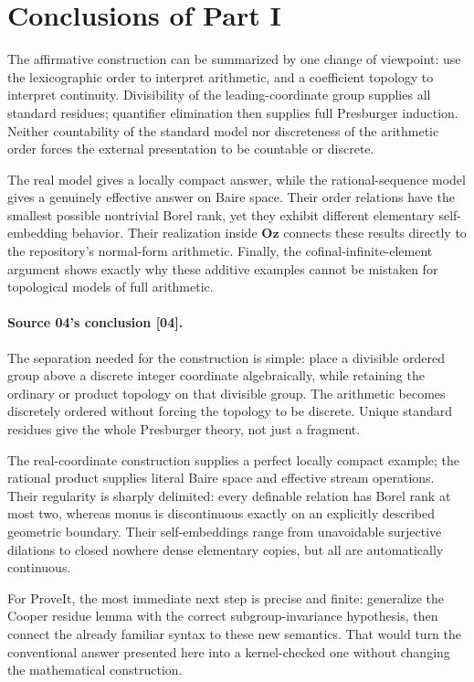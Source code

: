 \documentclass[11pt]{article}
\numberwithin{equation}{section}
\theoremstyle{definition}
\theoremstyle{remark}
\newcommand{\Oz}{\mathbf{Oz}}
\newcommand{\repo}{\textsf{ProveIt}}
\newcommand{\src}[1]{\textup{\textsf{\small[#1]}}}
\begin{document}
\section{Conclusions of Part I}\label{pma:pr:sec:conclusion}

The affirmative construction can be summarized by one change of viewpoint:
use the lexicographic order to interpret arithmetic, and a coefficient
topology to interpret continuity. Divisibility of the leading-coordinate
group supplies all standard residues; quantifier elimination then
supplies full Presburger induction. Neither countability of the standard
model nor discreteness of the arithmetic order forces the external
presentation to be countable or discrete.

The real model gives a locally compact answer, while the rational-sequence
model gives a genuinely effective answer on Baire space. Their order
relations have the smallest possible nontrivial Borel rank, yet they
exhibit different elementary self-embedding behavior. Their realization
inside $\Oz$ connects these results directly to the repository's
normal-form arithmetic. Finally, the cofinal-infinite-element argument
shows exactly why these additive examples cannot be mistaken for
topological models of full arithmetic.

\paragraph{Source 04's conclusion \src{04}.}

The separation needed for the construction is simple: place a divisible
ordered group above a discrete integer coordinate algebraically, while
retaining the ordinary or product topology on that divisible group.
The arithmetic becomes discretely ordered without forcing the topology
to be discrete. Unique standard residues give the whole Presburger theory,
not just a fragment.

The real-coordinate construction supplies a perfect locally compact
example; the rational product supplies literal Baire space and effective
stream operations. Their regularity is sharply delimited: every definable
relation has Borel rank at most two, whereas monus is discontinuous
exactly on an explicitly described geometric boundary. Their
self-embeddings range from unavoidable surjective dilations to closed
nowhere dense elementary copies, but all are automatically continuous.

For \repo, the most immediate next step is precise and finite: generalize
the Cooper residue lemma with the correct subgroup-invariance hypothesis,
then connect the already familiar syntax to these new semantics. That
would turn the conventional answer presented here into a kernel-checked
one without changing the mathematical construction.
\end{document}
